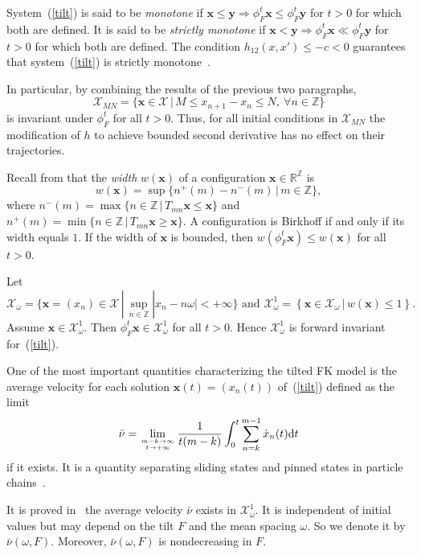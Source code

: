 \documentclass[12pt]{article}
\newcommand{\R}{\mathbb{R}}
\newcommand{\Z}{\mathbb{Z}}
\newcommand{\begeq}{\begin{equation}}
\newcommand{\eeq}{\end{equation}}
\newcommand{\refer}[1]{~(\ref{#1})}
\newcommand{\xbf}{{\mathbf{x}}}
\newcommand{\ybf}{{\mathbf{y}}}
\newcommand{\one}{{\mathbf{1}}}
\newcommand{\nubar}{{\bar{\nu}}}
\begin{document}

 System\refer{tilt}  is said to be {\em monotone} if
 $\xbf\leq \ybf\Rightarrow \phi_F^t\xbf\leq \phi_F^t\ybf$ for  $t>0$
 for which both are defined. It is said to be {\em strictly monotone} if
 $\xbf < \ybf\Rightarrow \phi_F^t\xbf\ll \phi_F^t\ybf$ for  $t>0$
 for which both are defined. The condition $h_{12}(x,x')\leq -c<0$ guarantees
that system\refer{tilt} is strictly monotone~\cite{BM}.

In particular, by combining the results of the previous two paragraphs,
$$
\mathcal{X}_{MN} = \{\xbf \in \mathcal{X}\,|\, M\le x_{n+1}-x_n\le N,\ \forall n\in\Z \}
$$
 is invariant under $\phi_F^t$ for all $t>0$.  Thus, for all initial conditions in $\mathcal{X}_{MN}$ the modification of $h$ to achieve bounded second derivative has no effect on their trajectories.

Recall from \cite{BM} that the {\em width} $w(\xbf)$ of a configuration $\xbf \in \R^\Z$ is
$$
w(\xbf)=\sup \{ n^+(m)-n^-(m)\,|\, m \in \Z \},$$
where $n^-(m) = \max \{n \in \Z \,|\, T_{mn}\xbf \le \xbf \}$ and $n^+(m) = \min \{n\in \Z \,|\, T_{mn} \xbf \ge \xbf \}$. A configuration is Birkhoff if and only if its width equals $1$. If the width of $\xbf$ is bounded, then $w(\phi_F^t\xbf)\leq w(\xbf)$ for all $t>0$.

  Let
  $$
  \mathcal{X}_{\omega}=\{\xbf=(x_n)\in\mathcal{X}\,|\,\sup_{n\in\Z}
  |x_n-n\omega|<+\infty\}\mbox{ and }
  \mathcal{X}_\omega^1=\left\{
  \xbf\in\mathcal{X}_\omega\,|\,w(\xbf)\leq 1\right\}.
  $$
Assume $\xbf\in\mathcal{X}_\omega^1$. Then $\phi_F^t\xbf\in\mathcal{X}_\omega^1$ for all $t>0$. Hence
   $\mathcal{X}_\omega^1$ is forward
   invariant for\refer{tilt}.

   One of the most important quantities characterizing the  tilted FK model
  is the average velocity for each solution $\xbf(t)=(x_n(t))$
 of\refer{tilt} defined as the limit
 \begeq\label{nubar}
 \bar\nu=\lim_{{m-k\to\infty}\atop {t\to +\infty}}\frac{1}{t(m-k)}\int_0^t
 \sum_{n=k}^{m-1}\dot{x}_n(t)\mbox{d}t
 \eeq
 if it exists. It is a quantity separating sliding states and pinned states in particle chains~\cite{FM}.

It is proved in~\cite{QW1} the average velocity $\bar\nu$ exists in $\mathcal{X}_\omega^1$. It is independent of initial values but may depend on the tilt $F$ and the mean spacing $\omega$. So we denote it by $\nubar (\omega, F)$. Moreover, $\nubar(\omega,F)$ is nondecreasing in $F$.
\end{document}
